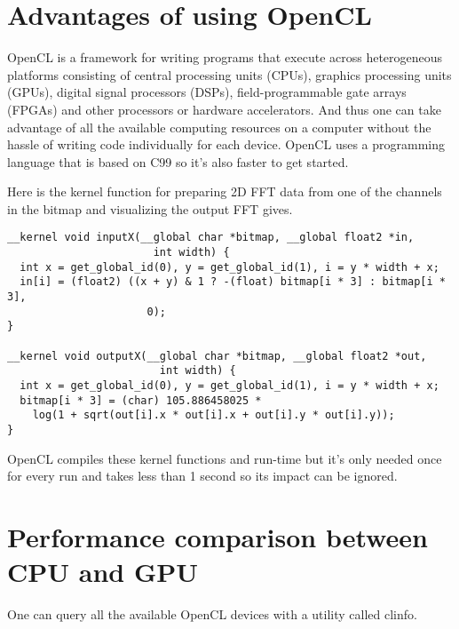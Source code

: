 \documentclass{article}
\begin{document}
  \section{Advantages of using OpenCL}

  OpenCL is a framework for writing programs that execute across heterogeneous platforms consisting of central
  processing units (CPUs), graphics processing units (GPUs), digital signal processors (DSPs), field-programmable gate
  arrays (FPGAs) and other processors or hardware accelerators. And thus one can take advantage of all the available
  computing resources on a computer without the hassle of writing code individually for each device. OpenCL uses a
  programming language that is based on C99 so it's also faster to get started.

  Here is the kernel function for preparing 2D FFT data from one of the channels in the bitmap and visualizing the
  output FFT gives.

  \begin{lstlisting}
__kernel void inputX(__global char *bitmap, __global float2 *in,
                       int width) {
  int x = get_global_id(0), y = get_global_id(1), i = y * width + x;
  in[i] = (float2) ((x + y) & 1 ? -(float) bitmap[i * 3] : bitmap[i * 3],
                      0);
}

__kernel void outputX(__global char *bitmap, __global float2 *out,
                        int width) {
  int x = get_global_id(0), y = get_global_id(1), i = y * width + x;
  bitmap[i * 3] = (char) 105.886458025 *
    log(1 + sqrt(out[i].x * out[i].x + out[i].y * out[i].y));
}
  \end{lstlisting}

  OpenCL compiles these kernel functions and run-time but it's only needed once for every run and takes less than 1
  second so its impact can be ignored.


  \section{Performance comparison between CPU and GPU}

  One can query all the available OpenCL devices with a utility called clinfo.
\end{document}
